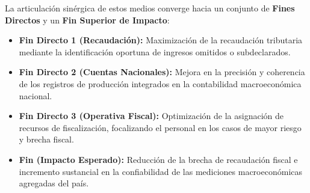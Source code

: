 La articulación sinérgica de estos medios converge hacia un conjunto de \textbf{Fines Directos} y un \textbf{Fin Superior de Impacto}:
\begin{itemize}
    \item \textbf{Fin Directo 1 (Recaudación):} Maximización de la recaudación tributaria mediante la identificación oportuna de ingresos omitidos o subdeclarados.
    \item \textbf{Fin Directo 2 (Cuentas Nacionales):} Mejora en la precisión y coherencia de los registros de producción integrados en la contabilidad macroeconómica nacional.
    \item \textbf{Fin Directo 3 (Operativa Fiscal):} Optimización de la asignación de recursos de fiscalización, focalizando el personal en los casos de mayor riesgo y brecha fiscal.
    \item \textbf{Fin (Impacto Esperado):} Reducción de la brecha de recaudación fiscal e incremento sustancial en la confiabilidad de las mediciones macroeconómicas agregadas del país.
\end{itemize}

